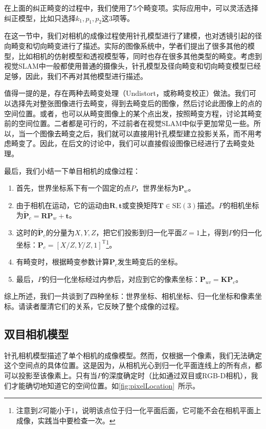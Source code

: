 在上面的纠正畸变的过程中，我们使用了5个畸变项。实际应用中，可以灵活选择纠正模型，比如只选择$k_1,p_1,p_2$这3项等。

在这一节中，我们对相机的成像过程使用针孔模型进行了建模，也对透镜引起的径向畸变和切向畸变进行了描述。实际的图像系统中，学者们提出了很多其他的模型，比如相机的仿射模型和透视模型等，同时也存在很多其他类型的畸变。考虑到视觉SLAM中一般都使用普通的摄像头，针孔模型及径向畸变和切向畸变模型已经足够，因此，我们不再对其他模型进行描述。

值得一提的是，存在两种去畸变处理（Undistort，或称畸变校正）做法。我们可以选择先对整张图像进行去畸变，得到去畸变后的图像，然后讨论此图像上的点的空间位置。或者，也可以从畸变图像上的某个点出发，按照畸变方程，讨论其畸变前的空间位置。二者都是可行的，不过前者在视觉SLAM中似乎更加常见一些。所以，当一个图像去畸变之后，我们就可以直接用针孔模型建立投影关系，而不用考虑畸变了。因此，在后文的讨论中，我们可以直接假设图像已经进行了去畸变处理。

最后，我们小结一下单目相机的成像过程：

\begin{enumerate}
	\item 首先，世界坐标系下有一个固定的点$P$，世界坐标为$\bm{P}_w$。
	\item 由于相机在运动，它的运动由$\bm{R}, \bm{t}$或变换矩阵$\bm{T} \in \mathrm{SE}(3)$描述。$P$的相机坐标为$\bm{\tilde{P}}_c = \bm{R} \bm{P}_w + \bm{t}$。
	\item 这时的$\bm{\tilde{P}}_c$的分量为$X,Y,Z$，把它们投影到归一化平面$Z=1$上，得到$P$的归一化坐标：$\bm{P}_c = [X/Z, Y/Z, 1]^\mathrm{T}$\footnote{注意到$Z$可能小于1，说明该点位于归一化平面后面，它可能不会在相机平面上成像，实践当中要检查一次。}。
	\item 有畸变时，根据畸变参数计算$\bm{P}_c$发生畸变后的坐标。
	\item 最后，$P$的归一化坐标经过内参后，对应到它的像素坐标：$\bm{P}_{uv} = \bm{K} \bm{P}_c$。
\end{enumerate}

综上所述，我们一共谈到了四种坐标：世界坐标、相机坐标、归一化坐标和像素坐标。请读者厘清它们的关系，它反映了整个成像的过程。

\subsection{双目相机模型}
针孔相机模型描述了单个相机的成像模型。然而，仅根据一个像素，我们无法确定这个空间点的具体位置。这是因为，从相机光心到归一化平面连线上的所有点，都可以投影至该像素上。只有当$P$的深度确定时（比如通过双目或RGB-D相机），我们才能确切地知道它的空间位置。如\autoref{fig:pixelLocation}~所示。

